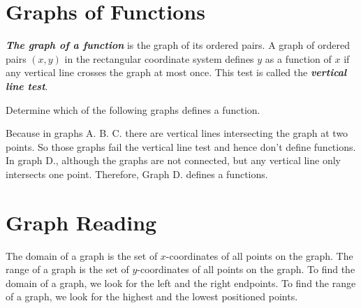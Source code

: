 \documentclass[
  en,11pt]{elegantbook}
\renewenvironment{example}[1][]{
  \refstepcounter{exam}
  \par\noindent\textbf{\color{main}{\examplename} \theexam #1}
  \rmfamily
}{
  \par\ignorespacesafterend
}
\begin{document}
\hypertarget{graphs-of-functions}{%
\section{Graphs of Functions}\label{graphs-of-functions}}

\textbf{\emph{The graph of a function}} is the graph of its ordered pairs. A graph of ordered pairs \((x,y)\) in the rectangular coordinate system defines \(y\) as a function of \(x\) if any vertical line crosses the graph at most once. This test is called the \textbf{\emph{vertical line test}}.

\begin{example}
Determine which of the following graphs defines a function.
\end{example}

\begin{figure}

{\centering {}

}

\caption{ }\label{fig:fig-ABCD-LaTeX}
\end{figure}

\begin{solution}

Because in graphs A. B. C. there are vertical lines intersecting the graph at two points. So those graphs fail the vertical line test and hence don't define functions. In graph D., although the graphs are not connected, but any vertical line only intersects one point. Therefore, Graph D. defines a functions.
\end{solution}

\hypertarget{graph-reading}{%
\section{Graph Reading}\label{graph-reading}}

The domain of a graph is the set of \(x\)-coordinates of all points on the graph. The range of a graph is the set of \(y\)-coordinates of all points on the graph. To find the domain of a graph, we look for the left and the right endpoints. To find the range of a graph, we look for the highest and the lowest positioned points.
\end{document}
